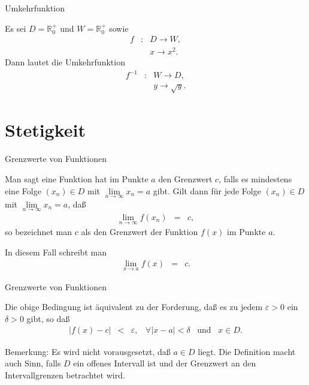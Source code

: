 \documentclass[german]{beamer}
\newcommand{\bq}{\begin{eqnarray*}}
\newcommand{\eq}{\end{eqnarray*}}
\newcommand{\eps}{\varepsilon}
\begin{document}
\begin{frame}{Umkehrfunktion}

\begin{example}
Es sei $D=\mathbb{R}_0^+$ und $W=\mathbb{R}_0^+$ sowie
\bq
 f & : & D \rightarrow W,
 \nonumber \\
 & & x \rightarrow x^2.
\eq
Dann lautet die Umkehrfunktion
\bq
 f^{-1} & : & W \rightarrow D,
 \nonumber \\
 & & y \rightarrow \sqrt{y}.
\eq
\end{example}

\end{frame}


\section{Stetigkeit}

\frame{\sectionpage}

\begin{frame}{Grenzwerte von Funktionen}

\begin{definition}
Man sagt eine Funktion hat im Punkte $a$ den Grenzwert $c$,
falls es mindestens eine Folge $(x_n)\in D$ mit $\lim\limits_{n \rightarrow \infty} x_n=a$ gibt.
Gilt dann f\"ur jede Folge $(x_n)\in D$ mit $\lim\limits_{n \rightarrow \infty} x_n=a$, da{\ss}
\bq
 \lim\limits_{n \rightarrow \infty} f\left(x_n\right) & = & c,
\eq
so bezeichnet man $c$ als den Grenzwert der Funktion $f(x)$ im Punkte $a$.
\end{definition}
In diesem Fall schreibt man
\bq
 \lim\limits_{x\rightarrow a} f(x) & = & c.
\eq

\end{frame}

\begin{frame}{Grenzwerte von Funktionen}

\begin{theorem}
Die obige Bedingung ist \"aquivalent zu der Forderung, da{\ss} 
es zu jedem $\eps>0$ ein $\delta>0$ gibt, so da{\ss}
\bq
 \left| f(x) - c \right| & < & \eps, \;\;\; \forall \left|x-a\right|<\delta
 \;\;\;\mbox{und} \;\;\;x\in D.
\eq
\end{theorem}

Bemerkung: Es wird nicht vorausgesetzt, da{\ss} $a\in D$ liegt. Die Definition macht auch Sinn,
falls $D$ ein offenes Intervall ist und der Grenzwert an den Intervallgrenzen betrachtet wird.

\end{frame}
\end{document}
